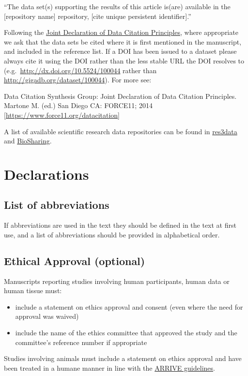 \documentclass[a4paper,num-refs,gigabyte]{oup-contemporary}
\begin{document}
``The data set(s) supporting the results of this article is(are) available in the [repository name] repository, [cite unique persistent identifier].''

Following the \href{https://www.force11.org/group/joint-declaration-data-citation-principles-final}{Joint Declaration of Data Citation Principles}, where appropriate we ask that the data sets be cited where it is first mentioned in the manuscript, and included in the reference list. If a DOI has been issued to a dataset please always cite it using the DOI rather than the less stable URL the DOI resolves to (e.g.~\url{http://dx.doi.org/10.5524/100044} rather than \url{http://gigadb.org/dataset/100044}). For more see:

Data Citation Synthesis Group: Joint Declaration of Data Citation Principles. Martone M. (ed.) San Diego CA: FORCE11; 2014 [\url{https://www.force11.org/datacitation}]

A list of available scientific research data repositories can be found in \href{http://www.re3data.org/}{res3data} and \href{https://biosharing.org/}{BioSharing}.

\section{Declarations}

\subsection{List of abbreviations}
If abbreviations are used in the text they should be defined in the text at first use, and a list of abbreviations should be provided in alphabetical order.

\subsection{Ethical Approval (optional)}
Manuscripts reporting studies involving human participants, human data or human tissue must:

\begin{itemize}
\item include a statement on ethics approval and consent (even where the need for approval was waived)
\item include the name of the ethics committee that approved the study and the committee's reference number if appropriate
\end{itemize}

Studies involving animals must include a statement on ethics approval and have been treated in a humane manner in line with the \href{http://www.nc3rs.org.uk/arrive-guidelines}{ARRIVE guidelines}.
\end{document}
